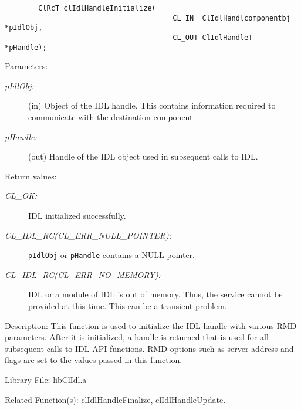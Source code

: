 \begin{flushleft}
\begin{Desc}
\footnotesize\begin{verbatim}        ClRcT clIdlHandleInitialize(
                                		CL_IN  ClIdlHandlcomponentbj *pIdlObj,
                		                CL_OUT ClIdlHandleT   *pHandle);
\end{verbatim}
\normalsize
\end{Desc}
\begin{Desc}
\item[Parameters:]
\begin{description}
\item[{\em p\-Idl\-Obj:}](in) Object of the IDL handle. This contains information required to communicate with the destination component.
\item[{\em p\-Handle:}](out) Handle of the IDL object used in subsequent calls to IDL.\end{description}
\end{Desc}
\begin{Desc}
\item[Return values:]
\begin{description}
\item[{\em CL\_\-OK:}]IDL initialized successfully.
\item[{\em CL\_\-IDL\_\-RC(CL\_\-ERR\_\-NULL\_\-POINTER):}]{\tt{pIdlObj}} or {\tt{pHandle}} contains a NULL pointer.
\item[{\em CL\_\-IDL\_\-RC(CL\_\-ERR\_\-NO\_\-MEMORY):}]IDL or a module of IDL is out of memory. Thus, the service cannot be provided at this time. 
This can be a transient problem.
\end{description}
\end{Desc}
\begin{Desc}
\item[Description:]This function is used to initialize the IDL handle with various RMD parameters. After it is initialized, a handle is returned that is 
used for all subsequent calls to IDL API functions. RMD options such as server address and flags are set to the values passed in this
function.
\end{Desc}
\begin{Desc}
\item[Library File:]lib\-Cl\-Idl.a\end{Desc}
\begin{Desc}
\item[Related Function(s):]\hyperlink{pageidl204}{cl\-Idl\-Handle\-Finalize}, \hyperlink{pageidl202}{cl\-Idl\-Handle\-Update}. \end{Desc}
\newpage


\end{flushleft}
